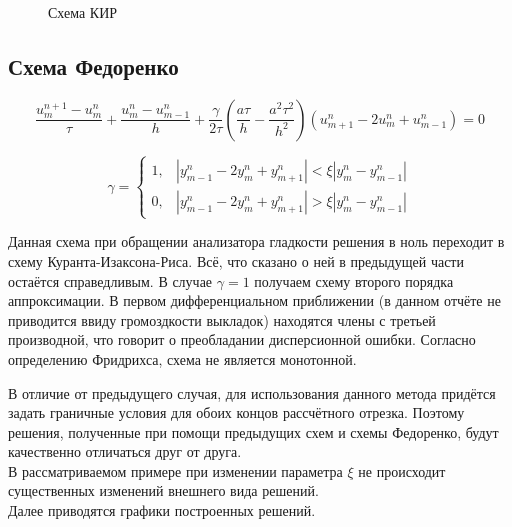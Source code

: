 \documentclass[a4paper,14pt]{article}
\begin{document}
\begin{figure}[h]
\begin{center}
			\caption{Схема КИР}           
		\end{center}
	\end{figure}
    
    \subsection{Схема Федоренко}
    \begin{equation}
\frac{u_{m}^{n+1}-u_{m}^{n}}{\tau}+\frac{u_{m}^{n}-u_{m-1}^{n}}{h}+\frac{\gamma}{2 \tau}\left(\frac{a \tau}{h}-\frac{a^{2} \tau^{2}}{h^{2}}\right)\left(u_{m+1}^{n}-2 u_{m}^{n}+u_{m-1}^{n}\right)=0
\end{equation}

\begin{equation}
\gamma=\left\{\begin{array}{ll}{1,} & {\left|y_{m-1}^{n}-2 y_{m}^{n}+y_{m+1}^{n}\right|<\xi\left|y_{m}^{n}-y_{m-1}^{n}\right|} \\ {0,} & {\left|y_{m-1}^{n}-2 y_{m}^{n}+y_{m+1}^{n}\right|>\xi\left|y_{m}^{n}-y_{m-1}^{n}\right|}\end{array}\right.
\end{equation}

Данная схема при обращении анализатора гладкости решения в ноль переходит в схему Куранта-Изаксона-Риса. Всё, что сказано о ней в предыдущей части остаётся справедливым. В случае $\gamma = 1$ получаем схему второго порядка аппроксимации. В первом дифференциальном приближении (в данном отчёте не приводится ввиду громоздкости выкладок) находятся члены с третьей производной, что говорит о преобладании дисперсионной ошибки. Согласно определению Фридрихса, схема не является монотонной.

В отличие от предыдущего случая, для использования данного метода придётся задать граничные условия для обоих концов рассчётного отрезка. Поэтому решения, полученные при помощи предыдущих схем и схемы Федоренко, будут качественно отличаться друг от друга. \\

В рассматриваемом примере при изменении параметра $\xi$ не происходит существенных изменений внешнего вида решений.\\
Далее приводятся графики построенных решений.
\end{document}
